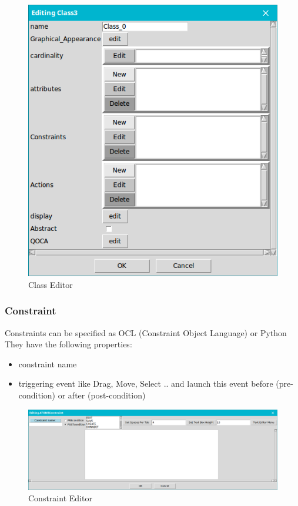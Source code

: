 \begin{figure}[th]
	\centering
		\includegraphics[scale=0.4]{ch3/img/class}
	\caption{\label{fig:Class Editor}Class Editor}
\end{figure} 

\subsubsection{ Constraint }

Constraints can be specified as OCL (Constraint Object Language) or Python
They have the following properties: 
\begin{itemize}
\newcommand{\localtextbulletone}{\textcolor{gray}{\raisebox{.45ex}{\rule{.6ex}{.6ex}}}}
\renewcommand{\labelitemi}{\localtextbulletone}
\item  constraint name
\item  triggering event  like Drag, Move, Select ..
and launch this event before (pre-condition) or after (post-condition)
 
\end{itemize}
 

\begin{figure}[th]
	\centering
	\includegraphics[scale=0.37]{ch3/img/const}
	\caption{\label{fig:Constraint Editor}Constraint Editor}
\end{figure} 
